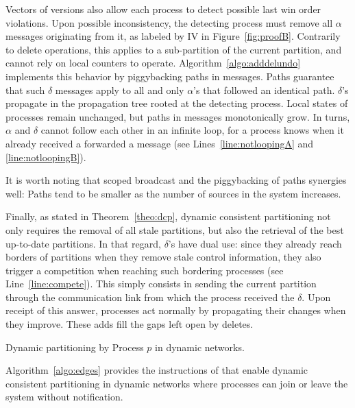 Vectors of versions also allow each process to detect possible last
win order violations. Upon possible inconsistency, the detecting
process must remove all $\alpha$ messages originating from it, as
labeled by IV in Figure~\ref{fig:proofB}. Contrarily to delete
operations, this applies to a sub-partition of the current partition,
and cannot rely on local counters to
operate. Algorithm~\ref{algo:adddelundo} implements this behavior by
piggybacking paths in messages. Paths guarantee that such $\delta$
messages apply to all and only $\alpha$'s that followed an identical
path. $\delta$'s propagate in the propagation tree rooted at the
detecting process. Local states of processes remain unchanged, but
paths in messages monotonically grow. In turns, $\alpha$ and $\delta$
cannot follow each other in an infinite loop, for a process knows when
it already received a forwarded a message (see
Lines~\ref{line:notloopingA} and \ref{line:notloopingB}).

\noindent It is worth noting that scoped broadcast and the
piggybacking of paths synergies well: Paths tend to be smaller as the
number of sources in the system increases.

Finally, as stated in Theorem~\ref{theo:dcp}, dynamic consistent
partitioning not only requires the removal of all stale partitions,
but also the retrieval of the best up-to-date partitions. In that
regard, $\delta$'s have dual use: since they already reach borders of
partitions when they remove stale control information, they also
trigger a competition when reaching such bordering processes (see
Line~\ref{line:compete}). This simply consists in sending the current
partition through the communication link from which the process
received the $\delta$. Upon receipt of this answer, processes act
normally by propagating their changes when they improve. These adds
fill the gaps left open by deletes.

\begin{algorithm}
  
  \caption{\label{algo:edges}Dynamic partitioning by Process $p$ in dynamic networks.}
\end{algorithm}

Algorithm~\ref{algo:edges} provides the instructions of \NAME that
enable dynamic consistent partitioning in dynamic networks where
processes can join or leave the system without
notification. 



